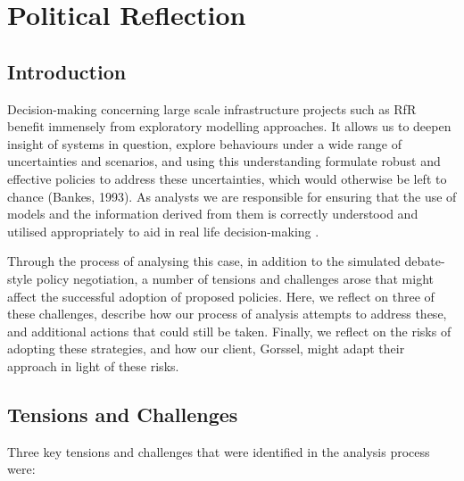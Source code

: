 \section{Political Reflection}
\label{s:poli_reflect}
\subsection{Introduction}

Decision-making concerning large scale infrastructure projects such as RfR benefit immensely from exploratory modelling approaches. It allows us to deepen insight of systems in question, explore behaviours under a wide range of uncertainties and scenarios, and using this understanding formulate robust and effective policies to address these uncertainties, which would otherwise be left to chance (Bankes, 1993). As analysts we are responsible for ensuring that the use of models and the information derived from them is correctly understood and utilised appropriately to aid in real life decision-making 
\parencite{pielke_honest_2007,van_enst_towards_2014}.

Through the process of analysing this case, in addition to the simulated debate-style policy negotiation, a number of tensions and challenges arose that might affect the successful adoption of proposed policies. Here, we reflect on three of these challenges, describe how our process of analysis attempts to address these, and additional actions that could still be taken. Finally, we reflect on the risks of adopting these strategies, and how our client, Gorssel, might adapt their approach in light of these risks.

\subsection{Tensions and Challenges} 

Three key tensions and challenges that were identified in the analysis process were:

